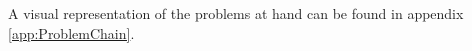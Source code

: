 A visual representation of the problems at hand can be found in appendix \ref{app:ProblemChain}.
\begin{comment}
\begin{enumerate}
	\item IT-department
	\begin{enumerate}
		\item Has an interest in automating as many processes as possible
		\item Current process forces them to put their other work aside to make time for the employment process
	\end{enumerate}
	\item Recruitment-department
	\begin{enumerate}
		\item Wants to keep the flat structure that Valcon currently employs
		\item Wants to keep the recruitment process as transparent as possible for the consultants
		\item Doesn't want to put additional work onto the consultants nor management
	\end{enumerate}
	\item Accounting
	\begin{enumerate}
		\item Current process rests on a single person, creating a bottleneck and resulting in the process halting during vacation or illness. Makes it hard to transfer the work to another employee.
	\end{enumerate}
	
\end{enumerate}
\end{comment}